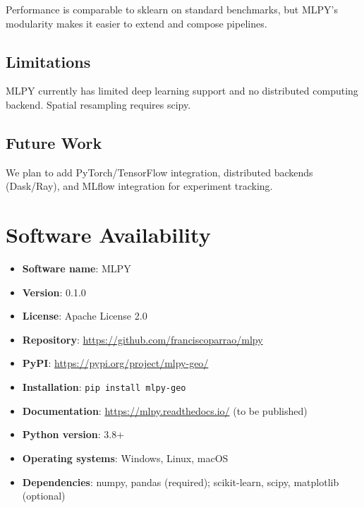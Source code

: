 \documentclass[twoside,11pt]{article}
\begin{document}
Performance is comparable to sklearn on standard benchmarks, but MLPY's modularity
makes it easier to extend and compose pipelines.

\subsection{Limitations}

MLPY currently has limited deep learning support and no distributed computing
backend. Spatial resampling requires scipy.

\subsection{Future Work}

We plan to add PyTorch/TensorFlow integration, distributed backends (Dask/Ray),
and MLflow integration for experiment tracking.

\section{Software Availability}
\label{sec:software}

\begin{itemize}
\item \textbf{Software name}: MLPY
\item \textbf{Version}: 0.1.0
\item \textbf{License}: Apache License 2.0
\item \textbf{Repository}: \url{https://github.com/franciscoparrao/mlpy}
\item \textbf{PyPI}: \url{https://pypi.org/project/mlpy-geo/}
\item \textbf{Installation}: \texttt{pip install mlpy-geo}
\item \textbf{Documentation}: \url{https://mlpy.readthedocs.io/} (to be published)
\item \textbf{Python version}: 3.8+
\item \textbf{Operating systems}: Windows, Linux, macOS
\item \textbf{Dependencies}: numpy, pandas (required); scikit-learn, scipy, matplotlib (optional)
\end{itemize}



\end{document}
